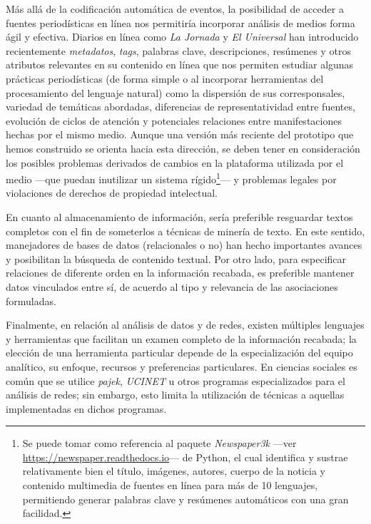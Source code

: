 \documentclass[letterpaper, 11pt]{book}
\theoremstyle{definition}
\theoremstyle{remark}
\begin{document}
Más allá de la codificación automática de eventos, la posibilidad de acceder a fuentes periodísticas en línea nos permitiría incorporar análisis de medios forma ágil y efectiva. 
Diarios en línea como \emph{La Jornada} y \emph{El Universal} han introducido recientemente \emph{metadatos}, \emph{tags}, palabras clave, descripciones, resúmenes y otros atributos relevantes en su contenido en línea que nos permiten estudiar algunas prácticas periodísticas (de forma simple o al incorporar herramientas del procesamiento del lenguaje natural) como la dispersión de sus corresponsales, variedad de temáticas abordadas, diferencias de representatividad entre fuentes, evolución de ciclos de atención y potenciales relaciones entre manifestaciones hechas por el mismo medio. 
Aunque una versión más reciente del prototipo que hemos construido se orienta hacia esta dirección, se deben tener en consideración los posibles problemas derivados de cambios en la plataforma utilizada por el medio ---que puedan inutilizar un sistema rígido\footnote{
    Se puede tomar como referencia al paquete \emph{Newspaper3k} ---ver \url{https://newspaper.readthedocs.io}--- de Python, el cual identifica y sustrae relativamente bien el título, imágenes, autores, cuerpo de la noticia y contenido multimedia de fuentes en línea para más de 10 lenguajes, permitiendo generar palabras clave y resúmenes automáticos con una gran facilidad. 
}--- 
y problemas legales por violaciones de derechos de propiedad intelectual. 


En cuanto al almacenamiento de información, sería preferible resguardar textos completos con el fin de someterlos a técnicas de minería de texto. 
En este sentido, manejadores de bases de datos (relacionales o no) han hecho importantes avances y posibilitan la búsqueda de contenido textual. 
Por otro lado, para especificar relaciones de diferente orden en la información recabada, es preferible mantener datos vinculados entre sí, de acuerdo al tipo y relevancia de las asociaciones formuladas. 


Finalmente, en relación al análisis de datos y de redes, existen múltiples lenguajes y herramientas que facilitan un examen completo de la información recabada; la elección de una herramienta particular depende de la especialización del equipo analítico, su enfoque, recursos y preferencias particulares. 
En ciencias sociales es común que se utilice \emph{pajek}, \emph{UCINET} u otros programas especializados para el análisis de redes; sin embargo, esto limita la utilización de técnicas a aquellas implementadas en dichos programas. 
\end{document}
